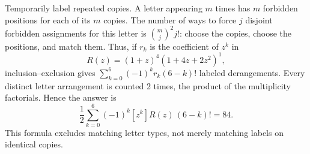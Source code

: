 Temporarily label repeated copies. A letter appearing $m$ times has $m$ forbidden positions for each of its $m$ copies. The number of ways to force $j$ disjoint forbidden assignments for this letter is $\binom mj^2j!$: choose the copies, choose the positions, and match them.
Thus, if $r_k$ is the coefficient of $z^k$ in
\[
R(z)=(1+z)^{4}(1+4z+2z^2)^{1},
\]
inclusion--exclusion gives $\sum_{k=0}^{6}(-1)^kr_k(6-k)!$ labeled derangements. Every distinct letter arrangement is counted 2 times, the product of the multiplicity factorials. Hence the answer is
\[
\boxed{\dfrac{1}{2}\sum_{k=0}^{6}(-1)^k[z^k]R(z)\,(6-k)!=84}.
\]
This formula excludes matching letter types, not merely matching labels on identical copies.
